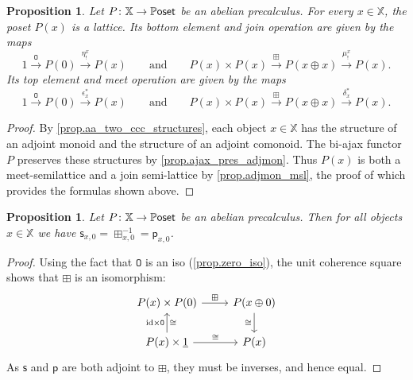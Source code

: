 \documentclass[11pt, oneside, article]{memoir}
\theoremstyle{plain}
\newtheorem{proposition}[theorem]{Proposition}
\theoremstyle{definition}
\theoremstyle{remark}
\newcommand{\const}[1]{\mathtt{#1}}%
\newcommand{\Cat}[1]{{\mathsf{#1}}}%
\newcommand{\CCat}[1]{\mathbb{\StrLeft{#1}{1}}\Cat{\StrGobbleLeft{#1}{1}}}%
\newcommand{\funn}[1]{\mathrm{#1}}%
\newcommand{\Funr}[1]{\mathsf{#1}}%
\newcommand{\xx}{\mathbb{X}}
\newcommand{\sss}{\Funr{s}}
\newcommand{\ppp}{\Funr{p}}
\newcommand{\id}{\funn{id}}
\newcommand{\abc}{P} %
\newcommand{\To}[1]{\xrightarrow{#1}}
\newcommand{\ul}[1]{\underline{#1}}
\newcommand{\lsh}[1]{#1_!}
\newcommand{\ust}[1]{#1^\ast}
\newcommand{\pposet}{\CCat{Poset}}
\newcommand{\zero}{\const{O}}
\newcommand{\qqand}{\qquad\text{and}\qquad}
\begin{document}
\begin{proposition}\label{prop.true_meet_false_join}
Let $\abc\colon\xx\to\pposet$ be an abelian precalculus. For every $x\in\xx$, the poset $\abc(x)$ is a lattice. Its bottom element and join operation are given by the maps
\[
	1\To{\zero}\abc(0)\To{\lsh{\eta^x}}\abc(x)
	\qqand
	\abc(x)\times \abc(x)\To{\boxplus}\abc(x\oplus x)\To{\lsh{\mu^x}}\abc(x).
\]
Its top element and meet operation are given by the maps
\[
	1\To{\zero}\abc(0)\To{\ust{\epsilon_x}}\abc(x)
	\qqand
	\abc(x)\times \abc(x)\To{\boxplus}\abc(x\oplus x)\To{\ust{\delta_x}}\abc(x).
\]
\end{proposition}
\begin{proof}
By \cref{prop.aa_two_ccc_structures}, each object $x\in\xx$ has the structure of an adjoint monoid and the structure of an adjoint comonoid. The bi-ajax functor $\abc$ preserves these structures by \cref{prop.ajax_pres_adjmon}. Thus $\abc(x)$ is both a meet-semilattice and a join semi-lattice by \cref{prop.adjmon_msl}, the proof of which provides the formulas shown above.
\end{proof}

\begin{proposition} \label{prop.boxzero_iso}
  Let $\abc\colon \xx \to \pposet$ be an abelian precalculus. Then for all objects $x\in\xx$ we have $\sss_{x,0} = \boxplus_{x,0}^{-1} = \ppp_{x,0}$.
\end{proposition}
\begin{proof}
  Using the fact that $\zero$ is an iso (\cref{prop.zero_iso}), the unit coherence square shows that $\boxplus$ is an isomorphism:
  \[
    \begin{tikzcd}
      \abc(x) \times \abc(0) \ar[r,"\boxplus"] & \abc(x \oplus 0) \ar[d,"\cong"'] \\
      \abc(x) \times \ul{1} \ar[u,"\id \times \zero","\cong"'] \ar[r, "\cong"] & \abc(x)
    \end{tikzcd}
  \]
  As $\sss$ and $\ppp$ are both adjoint to $\boxplus$, they must be inverses, and hence equal.
\end{proof}
\end{document}
